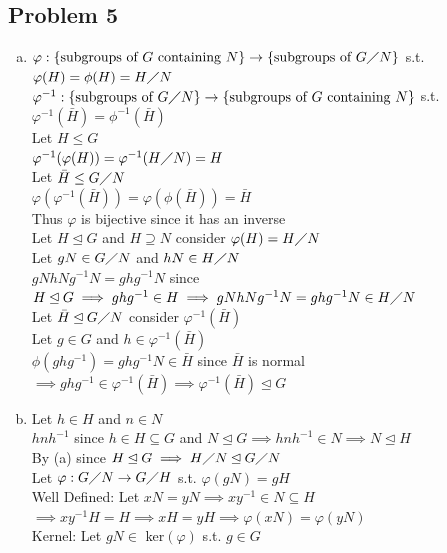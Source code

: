 \documentclass[12pt, letterpaper]{article}
\theoremstyle{definition}
\begin{document}
\subsection*{Problem 5}
\begin{enumerate}[(a)]
    \item $\varphi: \{\text{subgroups of $G$ containing $N$}\} \rightarrow \{\text{subgroups of $G \diagup N$}\}$ s.t. $\varphi(H)=\phi(H)=H\diagup N$\\
    $\varphi^{-1}: \{\text{subgroups of $G \diagup N$}\} \rightarrow \{\text{subgroups of $G$ containing $N$}\}$ s.t. $\varphi^{-1}(\bar{H})=\phi^{-1}(\bar{H})$\\
    Let $H \leq G$\\
    $\varphi^{-1}(\varphi(H))=\varphi^{-1}(H \diagup N)=H$\\
    Let $\bar{H} \leq G \diagup N$\\
    $\varphi(\varphi^{-1}(\bar{H}))=\varphi(\phi(\bar{H}))=\bar{H}$\\
    Thus $\varphi$ is bijective since it has an inverse\\
    Let $H \unlhd G$ and $H \supseteq N$ consider $\varphi(H)=H \diagup N$\\
    Let $gN \in G \diagup N$ and $hN \in H \diagup N$\\
    $gNhNg^{-1}N=ghg^{-1}N$ since $H \unlhd G \implies ghg^{-1} \in H \implies gNhNg^{-1}N=ghg^{-1}N \in H \diagup N$ \\
    Let $\bar{H} \unlhd G \diagup N$ consider $\varphi^{-1}(\bar{H})$\\
    Let $g \in G$ and $h \in \varphi^{-1}(\bar{H})$\\
    $\phi(ghg^{-1})=ghg^{-1}N \in \bar{H}$ since $\bar{H}$ is normal $ \implies ghg^{-1} \in \varphi^{-1}(\bar{H}) \implies \varphi^{-1}(\bar{H}) \unlhd G$
    \item Let $h \in H$ and $n \in N$\\
    $hnh^{-1}$ since $h \in H \subseteq G$ and $N \unlhd G \implies hnh^{-1} \in N \implies N \unlhd H$\\
    By (a) since $H \unlhd G \implies H \diagup N \unlhd G \diagup N$\\
    Let $\varphi: G \diagup N \rightarrow G \diagup H$ s.t. $\varphi(gN)=gH$\\
    Well Defined: Let $xN=yN \implies xy^{-1} \in N \subseteq H$\\
    $\implies xy^{-1}H=H \implies xH=yH \implies \varphi(xN)=\varphi(yN)$\\
    Kernel: Let $gN \in$ ker$(\varphi)$ s.t. $g \in G$\\

\end{enumerate}
\end{document}

